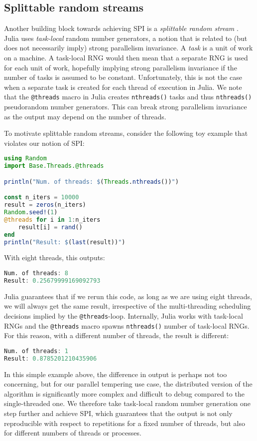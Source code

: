 \subsection{Splittable random streams}
\label{sec:splittable_randoms}
Another building block towards achieving SPI is a \emph{splittable random stream}
\cite{lecuyer1988splittable,burton1992splittable}. 
Julia uses \emph{task-local} random number generators, a notion that is 
related to (but does not necessarily imply) strong parallelism invariance. 
A \emph{task} is a unit of work on a machine.
A task-local RNG would then mean that a separate RNG is 
used for each unit of work, hopefully implying strong parallelism invariance
if the number of tasks is assumed to be constant. 
Unfortunately, this is not the case when a separate task is created for each thread 
of execution in Julia.
We note that the \texttt{@threads} macro in Julia creates \texttt{nthreads()}
tasks and thus \texttt{nthreads()} pseudorandom number generators.
This can break strong parallelism invariance as the output may depend on the number of 
threads.

 
To motivate splittable random streams, consider the following toy example 
that violates our notion of SPI:
\begin{lstlisting}[language = Julia]
using Random
import Base.Threads.@threads

println("Num. of threads: $(Threads.nthreads())")

const n_iters = 10000
result = zeros(n_iters)
Random.seed!(1)
@threads for i in 1:n_iters
    result[i] = rand()
end
println("Result: $(last(result))")
\end{lstlisting}
With eight threads, this outputs:
\begin{lstlisting}[language = Julia]
Num. of threads: 8
Result: 0.25679999169092793
\end{lstlisting}
Julia guarantees that if we rerun this code, as long as we are using eight threads, 
we will always get the same result, irrespective of the multi-threading 
scheduling decisions implied by the \texttt{@threads}-loop. 
Internally, Julia works with task-local RNGs and the \texttt{@threads} macro 
spawns \texttt{nthreads()} number of task-local RNGs.
For this reason, with a different number of threads, the result is different:
\begin{lstlisting}[language = Julia]
Num. of threads: 1
Result: 0.8785201210435906
\end{lstlisting}

In this simple example above, the difference in output is perhaps not too concerning, 
but for our parallel tempering 
use case, the distributed version of the algorithm is significantly more complex 
and difficult to debug compared to the single-threaded one. We therefore take task-local 
random number generation one step further and achieve SPI, which 
guarantees that the output is not only reproducible with respect to repetitions 
for a fixed number of threads, but also for different numbers of threads or processes.

